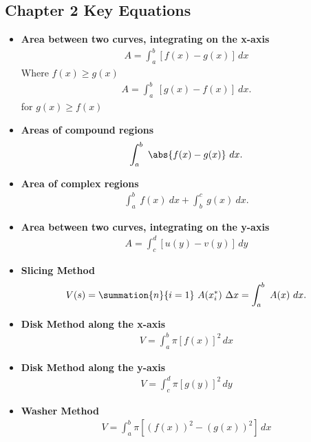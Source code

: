 \documentclass{report}
\begin{document}
    \pagebreak \bigbreak \noindent 
    \subsection{Chapter 2 Key Equations}
    \bigbreak \noindent 
    \begin{itemize}

    \item \textbf{Area between two curves, integrating on the x-axis}
    \begin{align}
        A = \int_{a}^{b} [f(x) - g(x)] \, dx
    \end{align}
    Where $f(x) \geq g(x)$
    \begin{align*}
        A = \int_{a}^{b}\ [g(x) - f(x)]\ dx
    .\end{align*}
    for $g(x) \geq f(x)$
    \item \textbf{Areas of compound regions}
        \begin{align*}
          \int_{a}^{b}\ \abs{f(x)-g(x)}\ dx 
        .\end{align*}
    \item \textbf{Area of complex regions}
        \begin{align*}
            \int_{a}^{b}\ f(x)\ dx + \int_{b}^{c}\ g(x)\ dx
        .\end{align*}
    \item \textbf{Area between two curves, integrating on the y-axis}
    \begin{align}
        A = \int_{c}^{d} [u(y) - v(y)] \, dy
    \end{align}
    \item \textbf{Slicing Method}
        \begin{align*}
            V(s) = \summation{n}{i=1}\ A(x_{i}^{*})\ \Delta x  = \int_{a}^{b}\ A(x)\ dx
        .\end{align*}
    \item \textbf{Disk Method along the x-axis}
    \begin{align}
        V = \int_{a}^{b} \pi [f(x)]^2 \, dx
    \end{align}

    \item \textbf{Disk Method along the y-axis}
    \begin{align}
        V = \int_{c}^{d} \pi [g(y)]^2 \, dy
    \end{align}

    \item \textbf{Washer Method}
    \begin{align}
        V = \int_{a}^{b} \pi [(f(x))^2 - (g(x))^2] \, dx
    \end{align}


\end{itemize}
\end{document}
